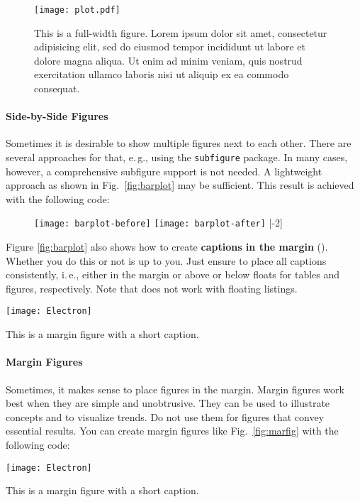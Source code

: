 \begin{figure*}[t]
\texttt{[image: plot.pdf]}
\caption{\label{fig:widefig}This is a full-width figure. Lorem ipsum dolor sit amet, consectetur adipisicing elit, sed do eiusmod tempor incididunt ut labore et dolore magna aliqua. Ut enim ad minim veniam, quis nostrud exercitation ullamco laboris nisi ut aliquip ex ea commodo consequat.}
\end{figure*}


\paragraph{Side-by-Side Figures} Sometimes it is desirable to show multiple figures next to each other. There are several approaches for that, e.\,g., using the \texttt{subfigure} package. In many cases, however, a comprehensive subfigure support is not needed. A lightweight approach as shown in Fig.~\ref{fig:barplot} may be sufficient. This result is achieved with the following code:
\begin{latex}
\begin{figure}[t]
\centering
\texttt{[image: barplot-before]}%
\hspace{\fill}%
\texttt{[image: barplot-after]}
[-2\baselineskip]
\end{figure}
\end{latex}

Figure \ref{fig:barplot} also shows how to create \textbf{captions in the margin} (). Whether you do this or not is up to you.
Just ensure to place all captions consistently, i.\,e., either in the margin or above or below floats for tables and figures, respectively. Note that  does not work with floating listings.


\begin{marginfigure}[1\baselineskip] %
\texttt{[image: Electron]}
\caption{\label{fig:marfig}This is a margin figure with a short caption.}
\end{marginfigure}

\paragraph{Margin Figures} Sometimes, it makes sense to place figures in the margin. Margin figures work best when they are simple and unobtrusive. They can be used to illustrate concepts and to visualize trends. Do not use them for figures that convey essential results.
%
You can create margin figures like Fig.~\ref{fig:marfig} with the following code:
\begin{latex}
\begin{marginfigure}[1\baselineskip] %
\texttt{[image: Electron]}
\caption{\label{fig:marfig}This is a margin figure with a short caption.}
\end{marginfigure}
\end{latex}


